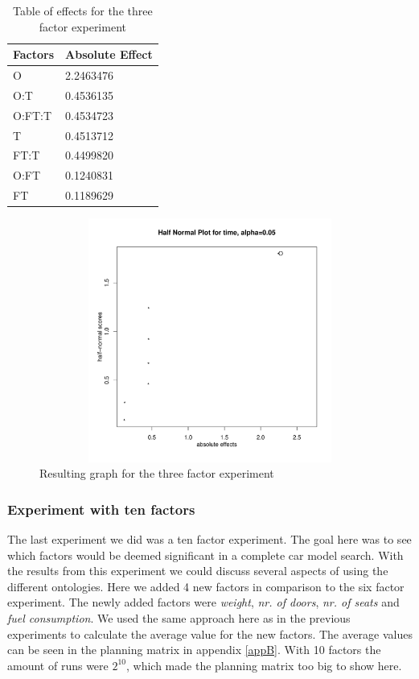 \documentclass{llncs}
\begin{document}
\begin{table}
\vspace{-25pt}
    \begin{tabular}{ | l l |}
    \hline
    {\bf Factors} & {\bf Absolute Effect}  \\ \hline
	  O     & 2.2463476\\ \hline
	  O:T    &0.4536135 \\ \hline
	  O:FT:T &0.4534723 \\ \hline
	  T      &0.4513712 \\ \hline
	  FT:T   &0.4499820\\ \hline
	  O:FT   &0.1240831 \\ \hline
	  FT     &0.1189629 \\ \hline
    \end{tabular}
\caption{Table of effects for the three factor experiment}\label{3factorEffect}
\vspace{-65pt}
\end{table} 


\begin{figure}
 \includegraphics[width=12cm, height=8cm]{2factorfinal.pdf}
  \caption{Resulting graph for the three factor experiment}\label{3factorGraph}
\end{figure}


\subsubsection{Experiment with ten factors}
The last experiment we did was a ten factor experiment. The goal here
was to see which factors would be deemed significant in a complete car
model search. With the results from this experiment we could discuss
several aspects of using the different ontologies.  Here we added 4
new factors in comparison to the six factor experiment. The newly
added factors were \emph{weight}, \emph{nr. of doors},
\emph{nr. of seats} and \emph{fuel consumption}. We used the same
approach here as in the previous experiments to calculate the average
value for the new factors. The average values can be seen in the
planning matrix in appendix \ref{appB}. With 10 factors the amount of
runs were $2^{10}$, which made the planning matrix too big to show here.
\end{document}
